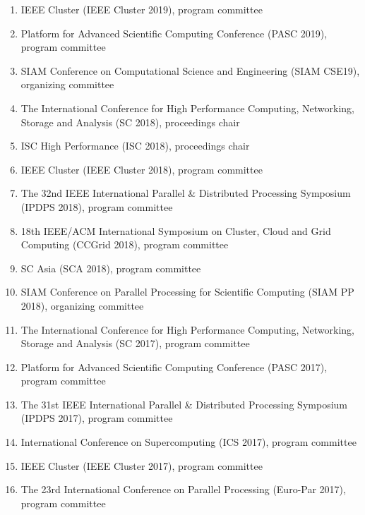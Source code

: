\documentclass[margin,line]{cv}
\begin{document}
\begin{resume}
\begin{enumerate}
\item IEEE Cluster (IEEE Cluster 2019), program committee

\item Platform for Advanced Scientific Computing Conference (PASC 2019), program committee

\item SIAM Conference on Computational Science and Engineering (SIAM CSE19), organizing committee

\item The International Conference for High Performance Computing, Networking, Storage and Analysis (SC 2018), proceedings chair

\item ISC High Performance (ISC 2018), proceedings chair

\item IEEE Cluster (IEEE Cluster 2018), program committee

\item The 32nd IEEE International Parallel \& Distributed Processing Symposium (IPDPS 2018), program committee

\item 18th IEEE/ACM International Symposium on Cluster, Cloud and Grid Computing (CCGrid 2018), program committee

\item SC Asia (SCA 2018), program committee

\item SIAM Conference on Parallel Processing for Scientific Computing (SIAM PP 2018), organizing committee

\item The International Conference for High Performance Computing, Networking, Storage and Analysis (SC 2017), program committee

\item Platform for Advanced Scientific Computing Conference (PASC 2017), program committee

\item The 31st IEEE International Parallel \& Distributed Processing Symposium (IPDPS 2017), program committee

\item International Conference on Supercomputing (ICS 2017), program committee

\item IEEE Cluster (IEEE Cluster 2017), program committee

\item The 23rd International Conference on Parallel Processing (Euro-Par 2017), program committee


\end{enumerate}
\end{resume}
\end{document}
